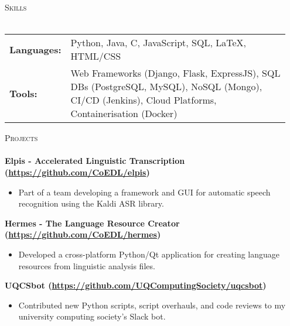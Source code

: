 \documentclass[a4paper]{article}
\newcommand{\lineunder} {
    \vspace*{-8pt} \\
    \hspace*{-10pt} \hrulefill \\
}
\newcommand{\header} [1] {
    {\hspace*{-10pt}\vspace*{6pt} \textsc{#1}}
    \vspace*{-6pt} \lineunder
}
\newenvironment{singleitem}
{   \small
    \vspace{0pt}
    \begin{itemize}
    \setlength{\itemsep}{0pt}
    \setlength{\parskip}{0pt}
    \setlength{\parsep}{0pt}   }
{\end{itemize} \vspace{1pt}	}
\begin{document}
\vspace{0.5mm}
\header{Skills}
\vspace{1.5mm}
\begin{tabular}{p{0.12\linewidth}p{0.83\linewidth}}
	\textbf{Languages:} & Python, Java, C, JavaScript, SQL, \LaTeX, HTML/CSS \\
	\textbf{Tools:} & Web Frameworks (Django, Flask, ExpressJS), SQL DBs (PostgreSQL, MySQL), NoSQL (Mongo), CI/CD (Jenkins), Cloud Platforms, Containerisation (Docker)
\end{tabular}

\vspace{1.5mm}

\header{Projects}

\textbf{{Elpis - Accelerated Linguistic Transcription} (\href{https://github.com/CoEDL/elpis}{https://github.com/CoEDL/elpis})}
\begin{singleitem}
	\item Part of a team developing a framework and GUI for automatic speech recognition using the Kaldi ASR library.
\end{singleitem}

\textbf{{Hermes - The Language Resource Creator} (\href{https://github.com/CoEDL/hermes}{https://github.com/CoEDL/hermes})}
\begin{singleitem}
	\item Developed a cross-platform Python/Qt application for creating language resources from linguistic analysis files.
\end{singleitem}


\textbf{UQCSbot (\href{https://github.com/UQComputingSociety/uqcsbot}{https://github.com/UQComputingSociety/uqcsbot})}
\begin{singleitem}
	\item Contributed new Python scripts, script overhauls, and code reviews to my university computing society's Slack bot.
\end{singleitem}
\end{document}
